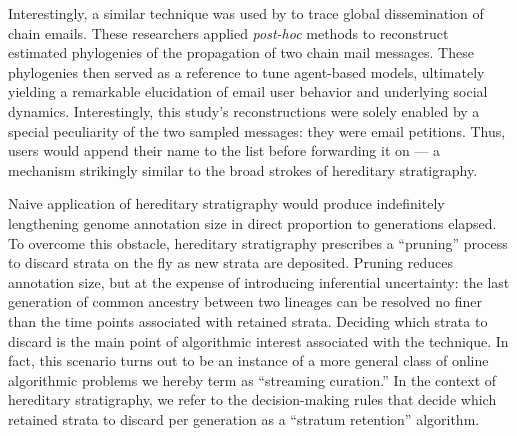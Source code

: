 Interestingly, a similar technique was used by \cite{libennowell2008tracing} to trace global dissemination of chain emails.
These researchers applied \textit{post-hoc} methods to reconstruct estimated phylogenies of the propagation of two chain mail messages.
These phylogenies then served as a reference to tune agent-based models, ultimately yielding a remarkable elucidation of email user behavior and underlying social dynamics.
Interestingly, this study's reconstructions were solely enabled by a special peculiarity of the two sampled messages: they were email petitions.
Thus, users would append their name to the list before forwarding it on --- a mechanism strikingly similar to the broad strokes of hereditary stratigraphy.

Naive application of hereditary stratigraphy would produce indefinitely lengthening genome annotation size in direct proportion to generations elapsed.
To overcome this obstacle, hereditary stratigraphy prescribes a ``pruning'' process to discard strata on the fly as new strata are deposited.
Pruning reduces annotation size, but at the expense of introducing inferential uncertainty: the last generation of common ancestry between two lineages can be resolved no finer than the time points associated with retained strata.
Deciding which strata to discard is the main point of algorithmic interest associated with the technique.
In fact, this scenario turns out to be an instance of a more general class of online algorithmic problems we hereby term as ``streaming curation.''
In the context of hereditary stratigraphy, we refer to the decision-making rules that decide which retained strata to discard per generation as a ``stratum retention'' algorithm.




